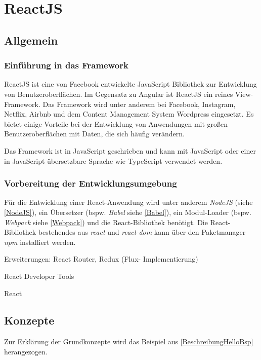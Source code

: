 \chapter{ReactJS}
\label{ch:reactJS}

\section{Allgemein}

\subsection{Einführung in das Framework}

ReactJS ist eine von Facebook entwickelte JavaScript Bibliothek zur Entwicklung von Benutzeroberflächen. Im Gegensatz zu Angular ist ReactJS ein reines View-Framework. Das Framework wird unter anderem bei Facebook, Instagram, Netflix, Airbnb und dem Content Management System Wordpress eingesetzt. Es bietet einige Vorteile bei der Entwicklung von Anwendungen mit großen Benutzeroberflächen mit Daten, die sich häufig verändern. 

Das Framework ist in JavaScript geschrieben und kann mit JavaScript oder einer in JavaScript übersetzbare Sprache wie TypeScript verwendet werden.\autocites[vgl.][1\psqq]{Gackenheimer.2015}[vgl.][3\psqq]{Zeigermann.2016}

\subsection{Vorbereitung der Entwicklungsumgebung}
Für die Entwicklung einer React-Anwendung wird unter anderem \textit{NodeJS} (siehe \autoref{NodeJS}), ein Übersetzer (bspw. \textit{Babel} siehe \autoref{Babel}), ein Modul-Loader (bspw. \textit{Webpack} siehe \autoref{Webpack}) und die React-Bibliothek benötigt. Die React-Bibliothek bestehendes aus \textit{react} und \textit{react-dom} kann über den Paketmanager \textit{npm} installiert werden. \autocites[vgl.][92\psqq]{Stefanov.2017}[vgl.][8\psqq]{Zeigermann.2016}





Erweiterungen: React Router, Redux (Flux- Implementierung)

React Developer Tools

React



\section{Konzepte}
Zur Erklärung der Grundkonzepte wird das Beispiel aus \autoref{BeschreibungHelloBsp} herangezogen.


